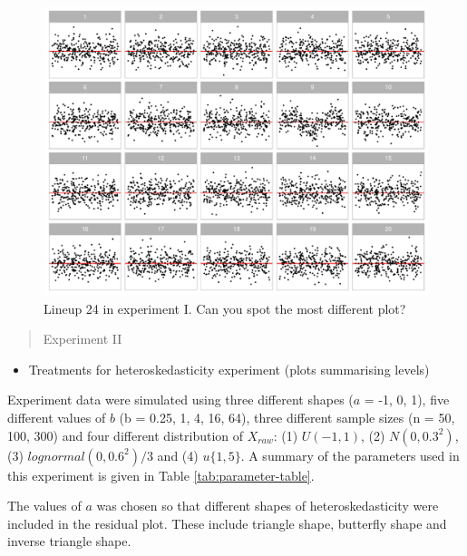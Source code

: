 \documentclass[]{interact}
\theoremstyle{plain}%
\theoremstyle{definition}
\theoremstyle{remark}
\def\tightlist{}
\begin{document}
\begin{figure}
\includegraphics[width=1\linewidth]{paper_comparison_files/figure-latex/example-lineup-1} \caption{Lineup 24 in experiment I. Can you spot the most different plot? \label{fig:example-lineup}}\label{fig:example-lineup}
\end{figure}

\begin{quote}
Experiment II
\end{quote}

\begin{itemize}
\tightlist
\item
  Treatments for heteroskedasticity experiment (plots summarising
  levels)
\end{itemize}

Experiment data were simulated using three different shapes (\(a\) = -1,
0, 1), five different values of \(b\) (b = 0.25, 1, 4, 16, 64), three
different sample sizes (n = 50, 100, 300) and four different
distribution of \(X_{raw}\): (1) \(U(-1, 1)\), (2) \(N(0, 0.3^2)\), (3)
\(lognormal(0, 0.6^2)/3\) and (4) \(u\{1, 5\}\). A summary of the
parameters used in this experiment is given in Table
\ref{tab:parameter-table}.

The values of \(a\) was chosen so that different shapes of
heteroskedasticity were included in the residual plot. These include
triangle shape, butterfly shape and inverse triangle shape.
\end{document}
